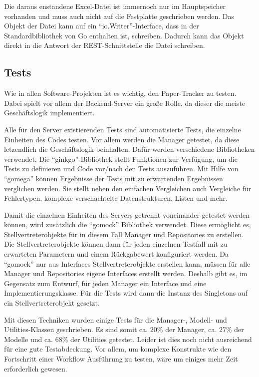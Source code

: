 Die daraus enstandene Excel-Datei ist immernoch nur im Hauptspeicher vorhanden
und muss auch nicht auf die Festplatte geschrieben werden.
Das Objekt der Datei kann auf ein \enquote{io.Writer}-Interface,
dass in der Standardbibliothek von Go enthalten ist, schreiben.
Dadurch kann das Objekt direkt in die Antwort der \gls{REST}-Schnittstelle die Datei schreiben.

\subsection{Tests}

Wie in allen Software-Projekten ist es wichtig, den Paper-Tracker zu testen.
Dabei spielt vor allem der Backend-Server ein große Rolle, da dieser die meiste Geschäftslogik implementiert.

Alle für den Server existierenden Tests sind automatisierte Tests, die einzelne Einheiten des Codes testen.
Vor allem werden die Manager getestet, da diese letzendlich die Geschäftslogik beinhalten.
Dafür werden verschiedene Bibliotheken verwendet.
Die \enquote{ginkgo}-Bibliothek stellt Funktionen zur Verfügung, um die Tests zu definieren
und Code vor/nach den Tests auszuführen.
Mit Hilfe von \enquote{gomega} können Ergebnisse der Tests mit zu erwartenden Ergebnissen verglichen werden.
Sie stellt neben den einfachen Vergleichen auch Vergleiche für Fehlertypen, komplexe verschachtelte Datenstrukturen,
Listen und mehr.

Damit die einzelnen Einheiten des Servers getrennt voneinander getestet werden können, wird zusätzlich die
\enquote{gomock} Bibliothek verwendet.
Diese ermöglicht es, Stellvertreterobjekte für in diesem Fall Manager und Repositories zu erstellen.
Die Stellvertreterobjekte können dann für jeden einzelnen Testfall mit zu erwarteten Parametern und einem Rückgabewert
konfiguriert werden.
Da \enquote{gomock} nur aus Interfaces Stellvertreterobjekte erstellen kann, müssen für alle Manager
und Repositories eigene Interfaces erstellt werden.
Deshalb gibt es, im Gegensatz zum Entwurf, für jeden Manager ein Interface und eine Implementierungsklasse.
Für die Tests wird dann die Instanz des Singletons auf ein Stellvertreterobjekt gesetzt.

Mit diesen Techniken wurden einige Tests für die Manager-, Modell- und Utilities-Klassen geschrieben.
Es sind somit ca. $20\%$ der Manager, ca. $27\%$ der Modelle und ca. $68\%$ der Utilities getestet.
Leider ist dies noch nicht ausreichend für eine gute Testabdeckung.
Vor allem, um komplexe Konstrukte wie den Fortschritt einer Workflow Ausführung zu testen, wäre um einiges mehr Zeit erforderlich
gewesen.

